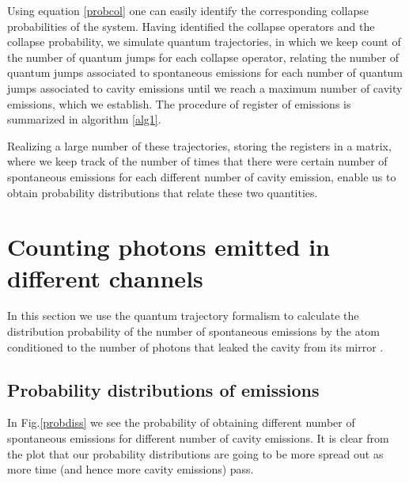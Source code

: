 \documentclass[conference]{IEEEtran}
\begin{document}
Using equation \eqref{probcol} one can easily identify the
corresponding collapse probabilities of the system. Having identified
the collapse operators and the collapse probability, we simulate
quantum trajectories, in which we keep count of the number of quantum
jumps for each collapse operator, relating the number of quantum jumps
associated to spontaneous emissions for each number of quantum jumps
associated to cavity emissions until we reach a maximum number of
cavity emissions, which we establish. The procedure of register of
emissions is summarized in algorithm \ref{alg1}.

Realizing a large number of these trajectories, storing the registers
in a matrix, where we keep track of the number of times that there
were certain number of spontaneous emissions for each different number
of cavity emission, enable us to obtain probability distributions that
relate these two quantities.



\section{Counting photons emitted in different channels}\label{sc:distributions}
In this section we use the quantum trajectory formalism to calculate
the distribution probability of the number of spontaneous emissions by
the atom conditioned to the number of photons that leaked the cavity
from its mirror .
\subsection{Probability distributions of emissions}

In Fig.\ref{probdiss} we see the probability of obtaining different number of spontaneous emissions for different number of cavity emissions. It is clear from the plot that our probability distributions are going to be more spread out as more time (and hence more cavity emissions) pass.
\end{document}
